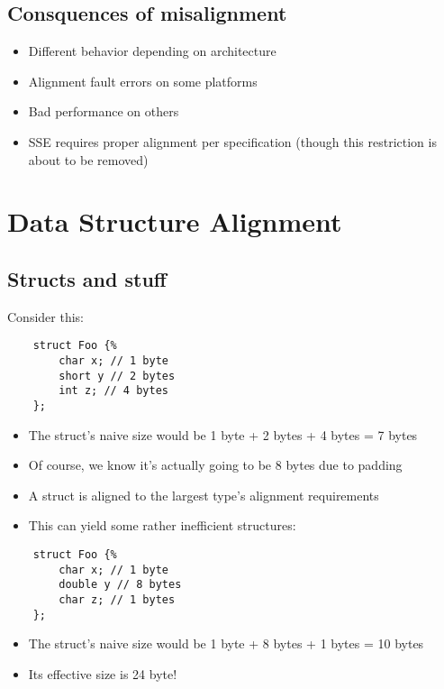 \documentclass{beamer}
\begin{document}
\subsection{Consquences of misalignment}
\begin{frame}{\insertsection}{\insertsubsection}
	\begin{itemize}
		\item Different behavior depending on architecture
		\item Alignment fault errors on some platforms
		\item Bad performance on others
		\item SSE requires proper alignment per specification (though this restriction is about to be removed)
	\end{itemize}
\end{frame}

\section{Data Structure Alignment}
\subsection{Structs and stuff}
\begin{frame}[fragile]{\insertsection}{\insertsubsection}
    Consider this:
    \begin{verbatim}
    struct Foo {%
        char x; // 1 byte
        short y // 2 bytes
        int z; // 4 bytes
    };
    \end{verbatim}
    \begin{itemize}
        \item The struct's naive size would be 1 byte + 2 bytes + 4 bytes = 7 bytes\pause
        \item Of course, we know it's actually going to be 8 bytes due to padding
    \end{itemize}
\end{frame}

\begin{frame}[fragile]{\insertsection}{\insertsubsection}
    \begin{itemize}
        \item A struct is aligned to the largest type's alignment requirements
        \item This can yield some rather inefficient structures:
    \end{itemize}
    \begin{verbatim}
    struct Foo {%
        char x; // 1 byte
        double y // 8 bytes
        char z; // 1 bytes
    };
    \end{verbatim}
    \begin{itemize}
        \item The struct's naive size would be 1 byte + 8 bytes + 1 bytes = 10 bytes\pause
        \item Its effective size is 24 byte!
    \end{itemize}
\end{frame}
\end{document}
